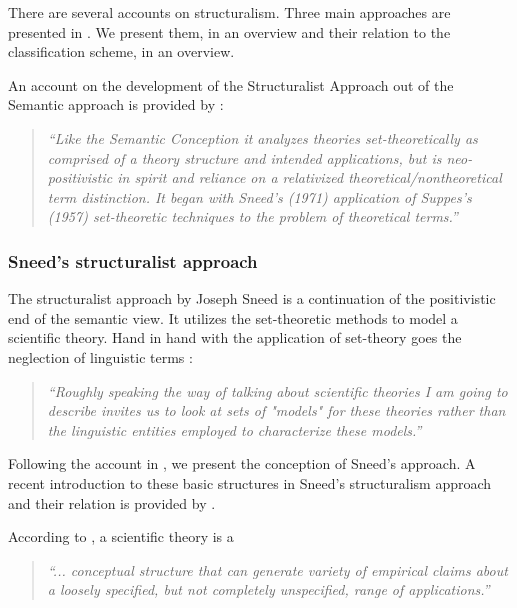 \documentclass{article}
\begin{document}
There are several accounts on structuralism. Three main approaches are presented in \cite[]{sep-physics-structuralism}. We present them, in an overview and their relation to the classification scheme, in an overview.

An account on the development of the Structuralist Approach out of the Semantic approach is provided by \cite[p.108]{suppe2000understanding}:

\begin{quote}
\textit{``Like the Semantic Conception it analyzes theories set-theoretically as comprised of a theory structure and intended applications, but is neo-positivistic in spirit and reliance on a relativized theoretical/nontheoretical term distinction. It began with Sneed's (1971) application of Suppes's (1957) set-theoretic techniques to the problem of theoretical terms.''}
\end{quote}

\subsubsection{Sneed's structuralist approach}

The structuralist approach by Joseph Sneed is a continuation of the positivistic end of the semantic view. It utilizes the set-theoretic methods to model a scientific theory. Hand in hand with the application of set-theory goes the neglection of linguistic terms \cite[p.144]{sneed1976philosophical}:

\begin{quote}
\textit{``Roughly speaking the way of talking about scientific theories I am going to describe invites us to look at sets of "models" for these theories rather than the linguistic entities employed to characterize these models.''}
\end{quote}

Following the account in \cite[]{sep-physics-structuralism}, we present the conception of Sneed's approach. A recent introduction to these basic structures in Sneed's structuralism approach and their relation is provided by \cite[]{andreas2014basic}.

According to \cite[p.120]{sneed1976philosophical}, a scientific theory is a 

\begin{quote}
\textit{``... conceptual structure that can generate variety of empirical claims about a loosely specified, but not completely unspecified, range of applications.''}
\end{quote}
\end{document}
